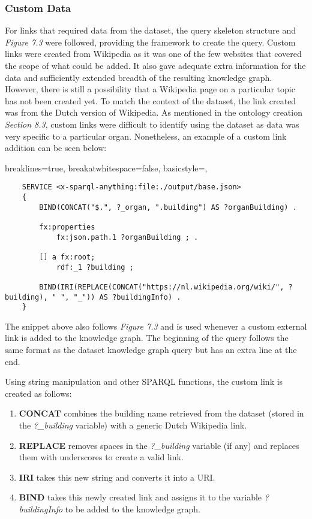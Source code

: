 \subsubsection{Custom Data}
\hspace*{0.5cm} For links that required data from the dataset, the query skeleton structure and \textit{Figure 7.3} were followed, providing the framework to create the query. Custom links were created from Wikipedia as it was one of the few websites that covered the scope of what could be added. It also gave adequate extra information for the data and sufficiently extended breadth of the resulting knowledge graph. However, there is still a possibility that a Wikipedia page on a particular topic has not been created yet. To match the context of the dataset, the link created was from the Dutch version of Wikipedia. As mentioned in the ontology creation \textit{Section 8.3}, custom links were difficult to identify using the dataset as data was very specific to a particular organ. Nonetheless, an example of a custom link addition can be seen below:

\lstset
{
    breaklines=true,
    breakatwhitespace=false,
    basicstyle=\linespread{1.5}\ttfamily,
}
\begin{lstlisting}
    SERVICE <x-sparql-anything:file:./output/base.json>
    {
        BIND(CONCAT("$.", ?_organ, ".building") AS ?organBuilding) .
    
        fx:properties
            fx:json.path.1 ?organBuilding ; .
    
        [] a fx:root; 
            rdf:_1 ?building ;
    
        BIND(IRI(REPLACE(CONCAT("https://nl.wikipedia.org/wiki/", ?building), " ", "_")) AS ?buildingInfo) . 
    } 
\end{lstlisting}

The snippet above also follows \textit{Figure 7.3} and is used whenever a custom external link is added to the knowledge graph. The beginning of the query follows the same format as the dataset knowledge graph query but has an extra line at the end.

Using string manipulation and other SPARQL functions, the custom link is created as follows:
\begin{enumerate}
    \item \textbf{CONCAT} combines the building name retrieved from the dataset (stored in the \textit{?\_building} variable) with a generic Dutch Wikipedia link.
    \item \textbf{REPLACE} removes spaces in the \textit{?\_building} variable (if any) and replaces them with underscores to create a valid link. 
    \item \textbf{IRI} takes this new string and converts it into a URI.
    \item \textbf{BIND} takes this newly created link and assigns it to the variable \textit{?buildingInfo} to be added to the knowledge graph. 
\end{enumerate}


